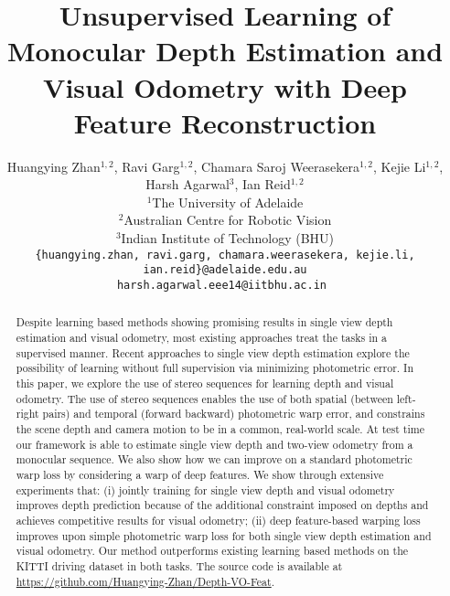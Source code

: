 \documentclass[10pt,twocolumn,letterpaper]{article}
\begin{document}
\title{Unsupervised Learning of Monocular Depth Estimation and Visual Odometry with Deep Feature Reconstruction
}

\author{Huangying Zhan{$^{1,2}$}, Ravi Garg{$^{1,2}$}, Chamara Saroj Weerasekera{$^{1,2}$}, Kejie Li{$^{1,2}$}, Harsh Agarwal{$^3$}, Ian Reid{$^{1,2}$}\\
	$^{1}$The University of Adelaide\\
	$^{2}$Australian Centre for Robotic Vision\\
	$^{3}$Indian Institute of Technology (BHU)\\
	\tt\small\{huangying.zhan, ravi.garg, chamara.weerasekera, kejie.li, ian.reid\}@adelaide.edu.au\\
	\tt\small harsh.agarwal.eee14@iitbhu.ac.in
}


\maketitle
\thispagestyle{empty}

\begin{abstract}

Despite learning based methods showing promising results in single view depth estimation and visual odometry, most existing approaches treat the tasks in a supervised manner. 
Recent approaches to single view depth estimation explore the possibility of learning without full supervision via minimizing photometric error.
In this paper, we explore the use of stereo sequences for learning depth and visual odometry.
The use of stereo sequences enables the use of both spatial (between left-right pairs) and temporal (forward backward) photometric warp error, and constrains the scene depth and camera motion to be in a common, real-world scale. At test time our framework is able to estimate single view depth and two-view odometry from a monocular sequence. We also show how we can improve on a standard photometric warp loss by considering a warp of deep features. 
We show through extensive experiments that: (i) jointly training for single view depth and visual odometry improves depth prediction because of the additional constraint imposed on depths and achieves competitive results for visual odometry; (ii) deep feature-based warping loss improves upon simple photometric warp loss for both single view depth estimation and visual odometry. Our method outperforms existing learning based methods on the KITTI driving dataset in both tasks. The source code is available at \url{https://github.com/Huangying-Zhan/Depth-VO-Feat}.



\end{abstract}
\end{document}
